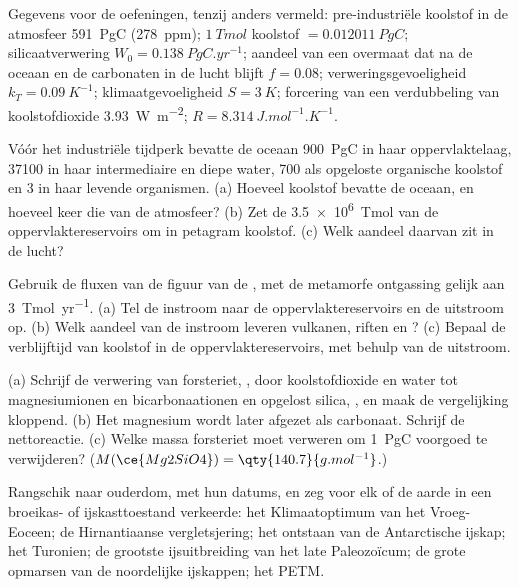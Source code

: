 Gegevens voor de oefeningen, tenzij anders vermeld: pre-industriële koolstof in de atmosfeer
\qty{591}{PgC} (\qty{278}{ppm}); $\qty{1}{Tmol}$ koolstof $= \qty{0.012011}{PgC}$;
silicaatverwering $W_0 = \qty{0.138}{PgC.yr^{-1}}$; aandeel van een overmaat dat na de oceaan en de
carbonaten in de lucht blijft $f = 0.08$; verweringsgevoeligheid $k_T = \qty{0.09}{K^{-1}}$; klimaatgevoeligheid $S =
\qty{3}{K}$; forcering van een verdubbeling van koolstofdioxide \qty{3.93}{W.m^{-2}}; $R =
\qty{8.314}{J.mol^{-1}.K^{-1}}$.

\begin{exercise}[$\star$]\label{exo:b2:deep-time-climate:1}
Vóór het industriële tijdperk bevatte de oceaan \qty{900}{PgC} in haar oppervlaktelaag, \num{37100} in haar
intermediaire en diepe water, 700 als opgeloste organische koolstof en 3 in haar levende organismen.
(a) Hoeveel koolstof bevatte de oceaan, en hoeveel keer die van de atmosfeer? (b) Zet de
\qty{3.5e6}{Tmol} van de oppervlaktereservoirs om in petagram koolstof. (c) Welk aandeel daarvan zit in de
lucht?
\end{exercise}

\begin{exercise}[$\star$]\label{exo:b2:deep-time-climate:2}
Gebruik de fluxen van de figuur van de , met de metamorfe ontgassing gelijk aan
\qty{3}{Tmol.yr^{-1}}. (a) Tel de instroom naar de oppervlaktereservoirs en de uitstroom op.
(b) Welk aandeel van de instroom leveren vulkanen, riften en ? (c) Bepaal de
verblijftijd van koolstof in de oppervlaktereservoirs, met behulp van de uitstroom.
\end{exercise}

\begin{exercise}[$\star$]\label{exo:b2:deep-time-climate:3}
(a) Schrijf de verwering van forsteriet, , door koolstofdioxide en water tot magnesiumionen
en bicarbonaationen en opgelost silica, , en maak de vergelijking kloppend. (b) Het magnesium wordt later
afgezet als carbonaat. Schrijf de nettoreactie. (c) Welke massa forsteriet moet verweren om
\qty{1}{PgC} voorgoed te verwijderen? ($M(\ce{Mg2SiO4}) = \qty{140.7}{g.mol^{-1}}$.)
\end{exercise}

\begin{exercise}[$\star$]\label{exo:b2:deep-time-climate:4}
Rangschik naar ouderdom, met hun datums, en zeg voor elk of de aarde in een broeikas- of
ijskasttoestand verkeerde: het Klimaatoptimum van het Vroeg-Eoceen; de Hirnantiaanse vergletsjering; het ontstaan van de
Antarctische ijskap; het Turonien; de grootste ijsuitbreiding van het late Paleozoïcum; de grote
opmarsen van de noordelijke ijskappen; het PETM.
\end{exercise}

